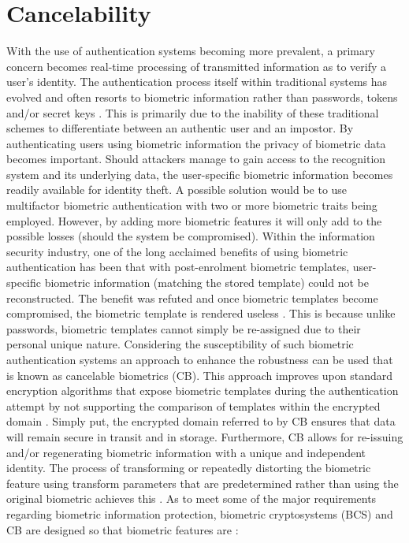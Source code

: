 \section[Cancelability]{Cancelability}
With the use of authentication systems becoming more prevalent, a primary concern becomes real-time processing of transmitted information as to verify a user’s identity. The authentication process itself within traditional systems has evolved and often resorts to biometric information rather than passwords, tokens and/or secret keys \citep{Verma2016}. This is primarily due to the inability of these traditional schemes to differentiate between an authentic user and an impostor. By authenticating users using biometric information the privacy of biometric data becomes important. Should attackers manage to gain access to the recognition system and its underlying data, the user-specific biometric information becomes readily available for identity theft. 
A possible solution would be to use multifactor biometric authentication with two or more biometric traits being employed. However, by adding more biometric features it will only add to the possible losses (should the system be compromised). Within the information security industry, one of the long acclaimed benefits of using biometric authentication has been that with post-enrolment biometric templates, user-specific biometric information (matching the stored template) could not be reconstructed. The benefit was refuted and once biometric templates become compromised, the biometric template is rendered useless \citep{Rathgeb2011}. This is because unlike passwords, biometric templates cannot simply be re-assigned due to their personal unique nature. Considering the susceptibility of such biometric authentication systems an approach to enhance the robustness can be used that is known as cancelable biometrics (CB). This approach improves upon standard encryption algorithms that expose biometric templates during the authentication attempt by not supporting the comparison of templates within the encrypted domain \citep{Rathgeb2011}. Simply put, the encrypted domain referred to by CB ensures that data will remain secure in transit and in storage. Furthermore, CB allows for re-issuing and/or regenerating biometric information with a unique and independent identity. The process of transforming or repeatedly distorting the biometric feature using transform parameters that are predetermined rather than using the original biometric achieves this \citep{Shahim2016}. As to meet some of the major requirements regarding biometric information protection, biometric cryptosystems (BCS) and CB are designed so that biometric features are \citep{Rathgeb2011, Verma2016}:

